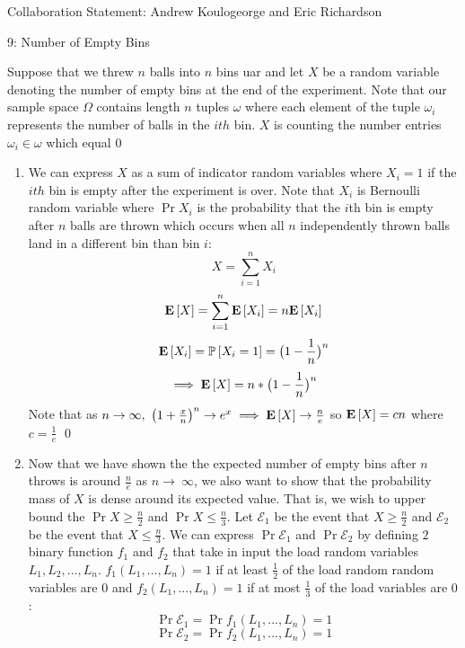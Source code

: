 \documentclass[12pt]{article}
\begin{document}

Collaboration Statement: Andrew Koulogeorge and Eric Richardson 

\begin{problem}{9: Number of Empty Bins}
\end{problem}

\begin{solution}
Suppose that we threw $n$ balls into $n$ bins uar and let $X$ be a random variable denoting the number of empty bins at the end of the experiment. Note that our sample space $\Omega$ contains length $n$ tuples $\omega$ where each element of the tuple $\omega_i$ represents the number of balls in the $ith$ bin. $X$ is counting the number entries $\omega_i \in \omega$ which equal $0$
\begin{enumerate}[label=(\alph*)]
    \item We can express $X$ as a sum of indicator random variables where $X_i=1$ if the $ith$ bin is empty after the experiment is over. Note that $X_i$ is Bernoulli random variable where $\Pr{X_i}$ is the probability that the $i$th bin is empty after $n$ balls are thrown which occurs when all $n$ independently thrown balls land in a different bin than bin $i$:
\[
X = \sum_{i=1}^{n}{X_i}
\]
\[
\mathbf{E}\left[X\right] = \sum_{i=1}^{n}{\mathbf{E}\left[X_i\right]} = n\mathbf{E}\left[X_i\right]
\]
\[
\mathbf{E}\left[X_i\right] = \mathbb{P}\left[X_i = 1\right] = \big(1-\frac{1}{n}\big)^n
\]
\[
\implies \mathbf{E}\left[X\right] = n * \big(1-\frac{1}{n}\big)^n
\]
Note that as $n \rightarrow \infty, ~\big(1 + \frac{x}{n}\big)^n \rightarrow e^x \implies \mathbf{E}\left[X\right] \rightarrow \frac{n}{e}$ so $\mathbf{E}\left[X\right] = cn$ where $c = \frac{1}{e}$ \qed
\item Now that we have shown the the expected number of empty bins after $n$ throws is around $\frac{n}{e}$ as $n\rightarrow~\infty$, we also want to show that the probability mass of $X$ is dense around its expected value. That is, we wish to upper bound the $\Pr{X \geq \frac{n}{2}}$ and $\Pr{X \leq \frac{n}{3}}$. Let $\mathcal{E}_1$ be the event that $X \geq \frac{n}{2}$ and $\mathcal{E}_2$ be the event that $X \leq \frac{n}{3}$. We can express $\Pr{\mathcal{E}_1}$ and $\Pr{\mathcal{E}_2}$ by defining $2$ binary function $f_1$ and $f_2$ that take in input the load random variables $L_1,L_2, ..., L_n$. $f_{1}(L_1, ..., L_n) = 1$ if at least $\frac{1}{2}$ of the load random random variables are $0$ and $f_{2}(L_1, ..., L_n) = 1$ if at most $\frac{1}{3}$ of the load variables are $0$:
\[
\Pr{\mathcal{E}_1} = \Pr{f_{1}(L_1, ..., L_n)=1}
\]
\[
\Pr{\mathcal{E}_2} = \Pr{f_{2}(L_1, ..., L_n)=1}
\]
\end{enumerate}
\end{solution}
\end{document}
